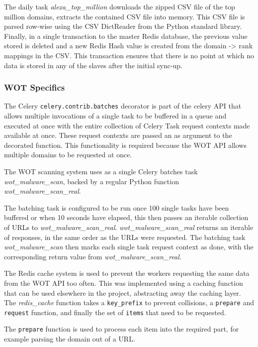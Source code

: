 The daily task \emph{alexa_top_million} downloads the zipped CSV file of the top million domains, extracts the contained CSV file into memory. This CSV file is parsed row-wise using the CSV DictReader from the Python standard library. Finally, in a single transaction to the master Redis database, the previous value stored is deleted and a new Redis Hash value is created from the domain -> rank mappings in the CSV. This transaction ensures that there is no point at which no data is stored in any of the slaves after the initial sync-up.

\subsubsection{WOT Specifics}
The Celery \verb`celery.contrib.batches` decorator is part of the celery API that allows multiple invocations of a single task to be buffered in a queue and executed at once with the entire collection of Celery Task request contexts made available at once. These request contexts are passed an as argument to the decorated function. This functionality is required because the WOT API allows multiple domains to be requested at once.

The WOT scanning system uses as a single Celery batches task \emph{wot_malware_scan}, backed by a regular Python function \emph{wot_malware_scan_real}.

The batching task is configured to be run once 100 single tasks have been buffered or when 10 seconds have elapsed, this then passes an iterable collection of URLs to \emph{wot_malware_scan_real}. \emph{wot_malware_scan_real} returns an iterable of responses, in the same order as the URLs were requested. The batching task \emph{wot_malware_scan} then marks each single task request context as done, with the corresponding return value from \emph{wot_malware_scan_real}\cite{celery-batches}.

The Redis cache system is used to prevent the workers requesting the same data from the WOT API too often.  This was implemented using a caching function that can be used elsewhere in the project, abstracting away the caching layer.  The \emph{redis_cache} function takes a \verb`key_prefix` to prevent collisions, a \verb`prepare` and \verb`request` function, and finally the set of \verb`items` that need to be requested.

The \verb`prepare` function is used to process each item into the required part, for example parsing the domain out of a URL.

